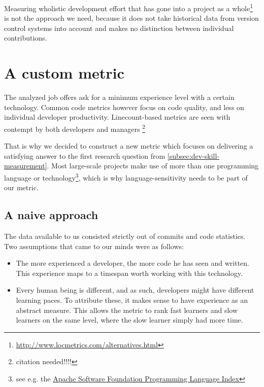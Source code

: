 Measuring wholistic development effort that has gone into a project as a
whole\footnote{\url{http://www.locmetrics.com/alternatives.html}}
is not the approach we need, because it does not take historical data from
version control systems into account and makes no distinction between
individual contributions.

\section{A custom metric}
The analyzed job offers ask for a minimum experience level with a certain technology.
Common code metrics however focus on code quality, and less on individual developer
productivity. Linecount-based metrics are seen with contempt
by both developers and managers \footnote{citation needed!!!!}
\newline

That is why we decided to construct a new metric which focuses on delivering a
satisfying answer to the first research question from \ref{subsec:dev-skill-measurement}.
Most large-scale projects make use of more than one programming language
or technology\footnote{see e.g. the \href{http://projects.apache.org/indexes/language.html}{Apache Software Foundation Programming Language Index}}, which is why language-sensitivity
needs to be part of our metric.

\subsection{A naive approach}
The data available to us consisted strictly out of commits and
code statistics. Two assumptions that came to our minds were as follows:

\begin{itemize}
 \item The more experienced a developer, the more code he has seen and written.
       This experience maps to a timespan worth working with this technology.
 \item Every human being is different, and as such, developers might have different learning paces.
       To attribute these, it makes sense to have experience as an abstract measure.
       This allows the metric to rank fast learners and slow learners on the same level,
       where the slow learner simply had more time.
\end{itemize}

